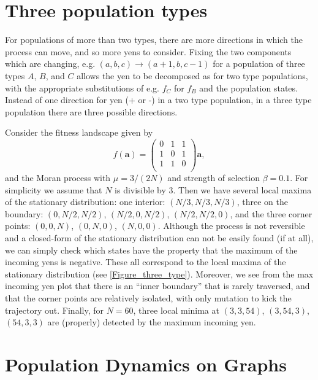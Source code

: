 \documentclass[aps,prd,11pt,notitlepage,nofootinbib,superscriptaddress,showkeys,letterpaper]{revtex4-1}
\begin{document}
\section{Three population types}

For populations of more than two types, there are more directions in which the
process can move, and so more yens to consider. Fixing the two components which are changing, e.g.
$(a, b, c) \to (a + 1, b, c - 1)$ for a population of three types $A$, $B$, and $C$
allows the yen to be decomposed as for two type populations, with the appropriate
substitutions of e.g. $f_C$ for $f_B$ and the population states. Instead of
one direction for yen (+ or -) in a two type population, in a three type
population there are three possible directions.

Consider the fitness landscape given by
\[ f(\mathbf{a}) = \left(\begin{matrix}
              0 & 1 & 1\\
              1 & 0 & 1\\
              1 & 1 & 0\\
              \end{matrix}\right) \mathbf{a},
\]
and the Moran process with $\mu = 3/(2N)$ and strength of selection $\beta = 0.1$.
For simplicity we assume that $N$ is divisible by 3. Then we have several local
maxima of the stationary distribution: one interior: $(N/3, N/3, N/3)$, three on
the boundary: $(0, N/2, N/2)$, $(N/2, 0, N/2)$, $(N/2, N/2, 0)$, and the three
corner points: $(0, 0, N)$, $(0, N, 0)$, $(N, 0, 0)$. Although the process is not
reversible and a closed-form of the stationary distribution can not be easily
found (if at all), we can simply check which states have the property that the
maximum of the incoming yens is negative. These all correspond to the local
maxima of the stationary distribution (see \ref{Figure_three_type}). Moreover, we
see from the max incoming yen plot that there is an ``inner boundary'' that
is rarely traversed, and that the corner points are relatively isolated, with
only mutation to kick the trajectory out. Finally, for $N=60$, three local minima
at $(3, 3, 54)$, $(3, 54, 3)$, $(54, 3, 3)$ are (properly) detected by the
maximum incoming yen.


\section{Population Dynamics on Graphs}
\end{document}
